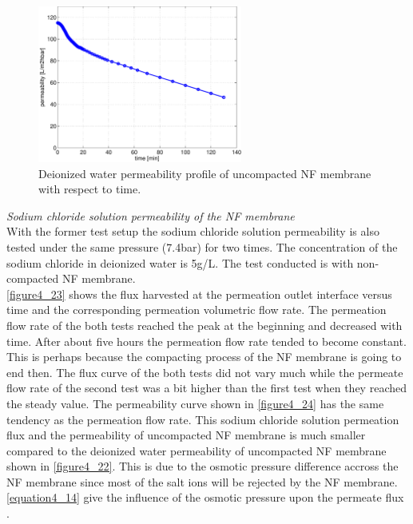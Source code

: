 \clearpage

\begin{figure}[ht]%
\centering
\includegraphics[width=0.6\textwidth]{figures/packagingandtestunderhighpressure/figure4_22.pdf}%
\caption{Deionized water permeability profile of uncompacted NF membrane with respect to time.}%
\label{figure4_22}%
\end{figure}

\noindent \textit{Sodium chloride solution permeability of the NF membrane}\\

With the former test setup the sodium chloride solution permeability is also tested under the same pressure (7.4bar) for two times. The concentration of the sodium chloride in deionized water is 5g/L. The test conducted is with non-compacted NF membrane.\\

\autoref{figure4_23} shows the flux harvested at the permeation outlet interface versus time and the corresponding permeation volumetric flow rate. The permeation flow rate of the both tests reached the peak at the beginning and decreased with time. After about five hours the permeation flow rate tended to become constant. This is perhaps because the compacting process of the NF membrane is going to end then. The flux curve of the both tests did not vary much while the permeate flow rate of the second test was a bit higher than the first test when they reached the steady value. The permeability curve shown in \autoref{figure4_24} has the same tendency as the permeation flow rate. This sodium chloride solution permeation flux and the permeability of uncompacted NF membrane is much smaller compared to the deionized water permeability of uncompacted NF membrane shown in \autoref{figure4_22}. This is due to the osmotic pressure difference accross the NF membrane since most of the salt ions will be rejected by the NF membrane. \autoref{equation4_14} give the influence of the osmotic pressure upon the permeate flux \cite{ref_5}.

